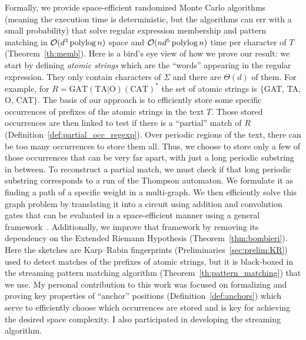 Formally, we provide space-efficient randomized Monte Carlo algorithms (meaning the execution time is deterministic, but the algorithms can err with a small probability) that solve regular expression membership and pattern matching in $\mathcal{O}(d^3\operatorname{polylog} n)$ space and $\mathcal{O}(nd^5\operatorname{polylog} n)$ time per character of $T$ (Theorem~\ref{th:memb}).
%
Here is a bird's eye view of how we prove our result: we start by defining \emph{atomic strings} which are the ``words'' appearing in the regular expression. They only contain characters of $\Sigma$ and there are $\Theta(d)$ of them. For example, for $R= \mathrm{GAT}(\mathrm{TA} | \mathrm{O})(\mathrm{CAT})^*$  the set of atomic strings is $\{$GAT, TA, O, CAT$\}$.
%
The basis of our approach is to efficiently store some specific occurrences of prefixes of the atomic strings in the text $T$. Those stored occurrences are then linked to test if there is a “partial” match of $R$ (Definition~\ref*{def:partial_occ_regexp}).
Over periodic regions of the text, there can be too many occurrences to store them all.
Thus, we choose to store only a few of those occurrences that can be very far apart, with just a long periodic substring in between. To reconstruct a partial match, we must check if that long periodic substring corresponds to a run of the Thompson automaton. We formulate it as finding a path of a specific weight in a multi-graph. We then efficiently solve this graph problem by translating it into a circuit using addition and convolution gates that can be evaluated in a space-efficient manner using a general framework~\cite{LokshtanovN10,Bringmann17}. Additionally, we improve that framework by removing its dependency on the Extended Riemann Hypothesis (Theorem~\ref{thm:bombieri}). 
Here the sketches are Karp--Rabin fingerprints (Preliminaries~\ref{sec:prelim:KR}) used to detect matches of the prefixes of atomic strings, but it is black-boxed in the streaming pattern matching algorithm (Theorem~\ref{th:pattern_matching}) that we use.
My personal contribution to this work was focused on formalizing and proving key properties of ``anchor'' positions (Definition~\ref{def:anchors}) which serve to efficiently choose which occurrences are stored and is key for achieving the desired space complexity. I also participated in developing the streaming algorithm. %



